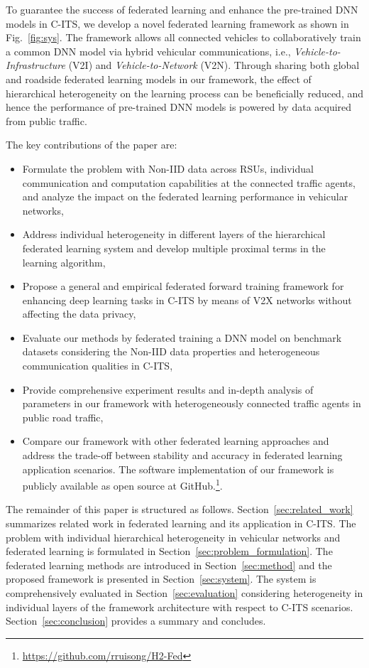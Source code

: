 To guarantee the success of federated learning and enhance the pre-trained DNN models in C-ITS, we develop a novel federated learning framework as shown in Fig.~\ref{fig:sys}. The framework allows all connected vehicles to collaboratively train a common DNN model via hybrid vehicular communications, i.e., \emph{Vehicle-to-Infrastructure} (V2I) and \emph{Vehicle-to-Network} (V2N). Through sharing both global and roadside federated learning models in our framework, the effect of hierarchical heterogeneity on the learning process can be beneficially reduced, and hence the performance of pre-trained DNN models is powered by data acquired from public traffic.

\noindent
The key contributions of the paper are:

\begin{itemize}
    \item Formulate the problem with Non-IID data across RSUs, individual communication and computation capabilities at the connected traffic agents, and analyze the impact on the federated learning performance in vehicular networks,
    \item Address individual heterogeneity in different layers of the hierarchical federated learning system and develop multiple proximal terms in the learning algorithm,
    \item Propose a general and empirical federated forward training framework for enhancing deep learning tasks in C-ITS by means of V2X networks without affecting the data privacy, 
    \item Evaluate our methods by federated training a DNN model on benchmark datasets considering the Non-IID data properties and heterogeneous communication qualities in C-ITS,
    \item Provide comprehensive experiment results and in-depth analysis of parameters in our framework with heterogeneously connected traffic agents in public road traffic,
    \item Compare our framework with other federated learning approaches and address the trade-off between stability and accuracy in federated learning application scenarios. The software implementation of our framework is publicly available as open source at GitHub.\footnote{\url{https://github.com/rruisong/H2-Fed}}.
\end{itemize}

The remainder of this paper is structured as follows. Section~\ref{sec:related_work} summarizes related work in federated learning and its application in C-ITS. The problem with individual hierarchical heterogeneity in vehicular networks and federated learning is formulated in Section~\ref{sec:problem_formulation}. The federated learning methods are introduced in Section~\ref{sec:method} and the proposed {\myHFed} framework is presented in Section~\ref{sec:system}. The system is comprehensively evaluated in Section~\ref{sec:evaluation} considering heterogeneity in individual layers of the framework architecture with respect to C-ITS scenarios. Section~\ref{sec:conclusion} provides a summary and concludes. 



